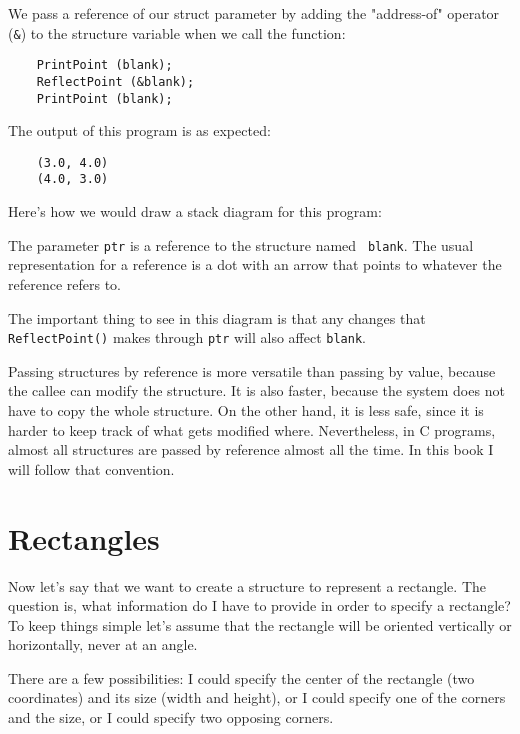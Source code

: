 %
We pass a reference of our struct parameter by adding the "address-of"  operator ({\tt \&}) to the
structure variable when we call the function:

\begin{verbatim}
	PrintPoint (blank);
	ReflectPoint (&blank);
	PrintPoint (blank);
\end{verbatim}
%
The output of this program is as expected:

\begin{verbatim}
	(3.0, 4.0)
	(4.0, 3.0)
\end{verbatim}
%
Here's how we would draw a stack diagram for this program:

\vspace{0.1in}
\centerline{}
\vspace{0.1in}
%
The parameter {\tt ptr} is a reference to the structure named {\tt
	blank}.  The usual representation for a reference is a dot with an
arrow that points to whatever the reference refers to.

The important thing to see in this diagram is that any changes that
{\tt ReflectPoint()} makes through {\tt ptr} will also affect {\tt blank}.

Passing structures by reference is more versatile than passing by
value, because the callee can modify the structure.  It is also
faster, because the system does not have to copy the whole
structure.  On the other hand, it is less safe, since it is harder to
keep track of what gets modified where.  Nevertheless, in C
programs, almost all structures are passed by reference almost all the
time.  In this book I will follow that convention.


\section{Rectangles}

Now let's say that we want to create a structure to represent
a rectangle.  The question is, what information do I have to
provide in order to specify a rectangle?  To keep things simple
let's assume that the rectangle will be oriented vertically or
horizontally, never at an angle.

There are a few possibilities: I could specify the center of
the rectangle (two coordinates) and its size (width and height),
or I could specify one of the corners and the size, or I
could specify two opposing corners.

